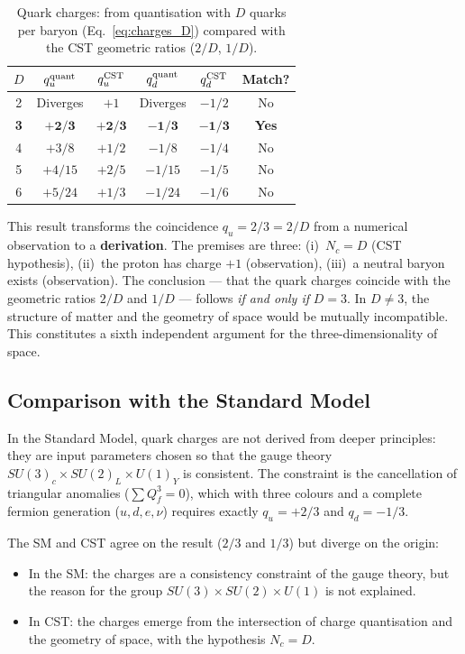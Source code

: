 \documentclass[10pt,a4paper]{article}
\begin{document}
\begin{table}[h]
\centering
\caption{Quark charges: from quantisation with $D$ quarks per baryon (Eq.~\ref{eq:charges_D}) compared with the CST geometric ratios ($2/D$, $1/D$).}\label{tab:charges}
\begin{tabular}{cccccc}
\toprule
$D$ & $q_u^{\rm quant}$ & $q_u^{\rm CST}$ & $q_d^{\rm quant}$ & $q_d^{\rm CST}$ & Match? \\
\midrule
2 & Diverges & $+1$ & Diverges & $-1/2$ & No \\
\textbf{3} & $\boldsymbol{+2/3}$ & $\boldsymbol{+2/3}$ & $\boldsymbol{-1/3}$ & $\boldsymbol{-1/3}$ & \textbf{Yes} \\
4 & $+3/8$ & $+1/2$ & $-1/8$ & $-1/4$ & No \\
5 & $+4/15$ & $+2/5$ & $-1/15$ & $-1/5$ & No \\
6 & $+5/24$ & $+1/3$ & $-1/24$ & $-1/6$ & No \\
\bottomrule
\end{tabular}
\end{table}

This result transforms the coincidence $q_u = 2/3 = 2/D$ from a numerical observation to a \textbf{derivation}. The premises are three: (i)~$N_c = D$ (CST hypothesis), (ii)~the proton has charge $+1$ (observation), (iii)~a neutral baryon exists (observation). The conclusion --- that the quark charges coincide with the geometric ratios $2/D$ and $1/D$ --- follows \textit{if and only if} $D = 3$. In $D \neq 3$, the structure of matter and the geometry of space would be mutually incompatible. This constitutes a sixth independent argument for the three-dimensionality of space.

\subsection{Comparison with the Standard Model}

In the Standard Model, quark charges are not derived from deeper principles: they are input parameters chosen so that the gauge theory $SU(3)_c \times SU(2)_L \times U(1)_Y$ is consistent. The constraint is the cancellation of triangular anomalies ($\sum Q_f^3 = 0$), which with three colours and a complete fermion generation ($u, d, e, \nu$) requires exactly $q_u = +2/3$ and $q_d = -1/3$.

The SM and CST agree on the result ($2/3$ and $1/3$) but diverge on the origin:
\begin{itemize}
\item In the SM: the charges are a consistency constraint of the gauge theory, but the reason for the group $SU(3) \times SU(2) \times U(1)$ is not explained.
\item In CST: the charges emerge from the intersection of charge quantisation and the geometry of space, with the hypothesis $N_c = D$.
\end{itemize}
\end{document}
